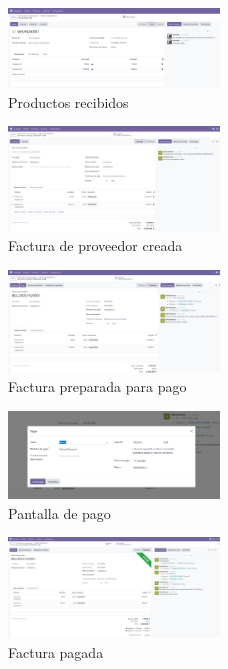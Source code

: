 \documentclass[a4paper,12pt]{article}
\begin{document}
\begin{figure}[h!]
    \centering
    \includegraphics[width=0.5\textwidth]{pr2odoo31-productosRecibidos.png}
    \caption{Productos recibidos}
\end{figure}
\FloatBarrier

\begin{figure}[h!]
    \centering
    \includegraphics[width=0.5\textwidth]{pr2odoo32-facturaProveedorCreada.png}
    \caption{Factura de proveedor creada}
\end{figure}
\FloatBarrier

\begin{figure}[h!]
    \centering
    \includegraphics[width=0.5\textwidth]{pr2odoo33-preparadaParaPago.png}
    \caption{Factura preparada para pago}
\end{figure}
\FloatBarrier

\begin{figure}[h!]
    \centering
    \includegraphics[width=0.5\textwidth]{pr2odoo34-pantallaPago.png}
    \caption{Pantalla de pago}
\end{figure}
\FloatBarrier

\begin{figure}[h!]
    \centering
    \includegraphics[width=0.5\textwidth]{pr2odoo35-facturaPagada.png}
    \caption{Factura pagada}
\end{figure}
\FloatBarrier
\end{document}
